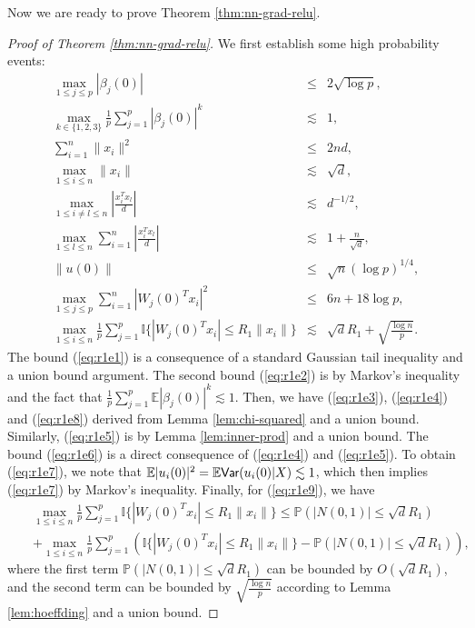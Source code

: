 Now we are ready to prove Theorem \ref{thm:nn-grad-relu}.
\begin{proof}[Proof of Theorem \ref{thm:nn-grad-relu}]
We first establish some high probability events:
\begin{eqnarray}
\label{eq:r1e1} \max_{1\leq j\leq p}|\beta_j(0)| &\leq& 2\sqrt{\log p}, \\
\label{eq:r1e2} \max_{k\in\{1,2,3\}}\frac{1}{p}\sum_{j=1}^p|\beta_j(0)|^k &\lesssim& 1, \\
\label{eq:r1e3} \sum_{i=1}^n\|x_i\|^2 &\leq& 2nd, \\
\label{eq:r1e4} \max_{1\leq i\leq n}\|x_i\| &\lesssim& \sqrt{d}, \\
\label{eq:r1e5} \max_{1\leq i\neq l\leq n}\left|\frac{x_i^Tx_l}{d}\right| &\lesssim& d^{-1/2}, \\
\label{eq:r1e6}\max_{1\leq l\leq n}\sum_{i=1}^n\left|\frac{x_i^Tx_l}{d}\right| &\lesssim& 1+\frac{n}{\sqrt{d}}, \\
 \label{eq:r1e7}\|u(0)\| &\leq& \sqrt{n}(\log p)^{1/4}, \\
 \label{eq:r1e8}\max_{1\leq j\leq p}\sum_{i=1}^n|W_j(0)^Tx_i|^2 &\leq& 6n+18\log p, \\
 \label{eq:r1e9}\max_{1\leq i\leq n}\frac{1}{p}\sum_{j=1}^p\mathbb{I}\{|W_j(0)^Tx_i|\leq R_1\|x_i\|\} &\lesssim& \sqrt{d}R_1 + \sqrt{\frac{\log n}{p}}.
\end{eqnarray}
The bound (\ref{eq:r1e1}) is a consequence of a standard Gaussian tail inequality and a union bound argument. The second bound (\ref{eq:r1e2}) is by Markov's inequality and the fact that $\frac{1}{p}\sum_{j=1}^p\mathbb{E}|\beta_j(0)|^k\lesssim 1$. Then, we have (\ref{eq:r1e3}), (\ref{eq:r1e4}) and (\ref{eq:r1e8}) derived from Lemma \ref{lem:chi-squared} and a union bound. Similarly, (\ref{eq:r1e5}) is by Lemma \ref{lem:inner-prod} and a union bound. The bound (\ref{eq:r1e6}) is a direct consequence of (\ref{eq:r1e4}) and (\ref{eq:r1e5}). To obtain (\ref{eq:r1e7}), we note that $\mathbb{E}|u_i(0)|^2 = \mathbb{E}\textsf{Var}(u_i(0)|X) \lesssim 1$, which then implies (\ref{eq:r1e7}) by Markov's inequality. Finally, for (\ref{eq:r1e9}), we have
\begin{eqnarray*}
&&\max_{1\leq i\leq n}\frac{1}{p}\sum_{j=1}^p\mathbb{I}\{|W_j(0)^Tx_i|\leq R_1\|x_i\|\} \leq \mathbb{P}\left(|N(0,1)|\leq \sqrt{d}R_1\right) \\
&&+ \max_{1\leq i\leq n}\frac{1}{p}\sum_{j=1}^p\left(\mathbb{I}\{|W_j(0)^Tx_i|\leq R_1\|x_i\|\}-\mathbb{P}\left(|N(0,1)|\leq \sqrt{d}R_1\right)\right),
\end{eqnarray*}
where the first term $\mathbb{P}\left(|N(0,1)|\leq \sqrt{d}R_1\right)$ can be bounded by $O(\sqrt{d}R_1)$, and the second term can be bounded by $\sqrt{\frac{\log n}{p}}$ according to Lemma \ref{lem:hoeffding} and a union bound.


\end{proof}

